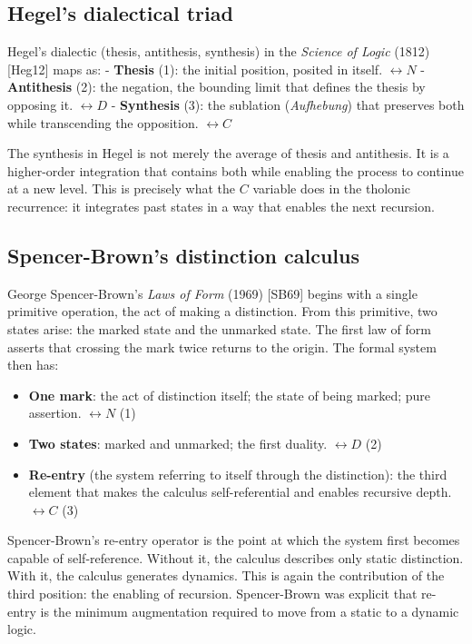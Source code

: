 \documentclass[12pt]{article}
\providecommand{\tightlist}{%
  \setlength{\itemsep}{0pt}\setlength{\parskip}{0pt}}
\begin{document}
\subsection{Hegel's dialectical triad}\label{hegels-dialectical-triad}

Hegel's dialectic (thesis, antithesis, synthesis) in the \emph{Science
of Logic} (1812) {[}Heg12{]} maps as: - \textbf{Thesis} (1): the initial
position, posited in itself. \(\leftrightarrow N\) - \textbf{Antithesis}
(2): the negation, the bounding limit that defines the thesis by
opposing it. \(\leftrightarrow D\) - \textbf{Synthesis} (3): the
sublation (\emph{Aufhebung}) that preserves both while transcending the
opposition. \(\leftrightarrow C\)

The synthesis in Hegel is not merely the average of thesis and
antithesis. It is a higher-order integration that contains both while
enabling the process to continue at a new level. This is precisely what
the \(C\) variable does in the tholonic recurrence: it integrates past
states in a way that enables the next recursion.

\subsection{Spencer-Brown's distinction calculus}\label{spencer-browns-distinction-calculus}

George Spencer-Brown's \emph{Laws of Form} (1969) {[}SB69{]} begins with
a single primitive operation, the act of making a distinction. From this
primitive, two states arise: the marked state and the unmarked state.
The first law of form asserts that crossing the mark twice returns to
the origin. The formal system then has:

\begin{itemize}
\tightlist
\item
  \textbf{One mark}: the act of distinction itself; the state of being
  marked; pure assertion. \(\leftrightarrow N\) (1)
\item
  \textbf{Two states}: marked and unmarked; the first duality.
  \(\leftrightarrow D\) (2)
\item
  \textbf{Re-entry} (the system referring to itself through the
  distinction): the third element that makes the calculus
  self-referential and enables recursive depth. \(\leftrightarrow C\)
  (3)
\end{itemize}

Spencer-Brown's re-entry operator is the point at which the system first
becomes capable of self-reference. Without it, the calculus describes
only static distinction. With it, the calculus generates dynamics. This
is again the contribution of the third position: the enabling of
recursion. Spencer-Brown was explicit that re-entry is the minimum
augmentation required to move from a static to a dynamic logic.
\end{document}
